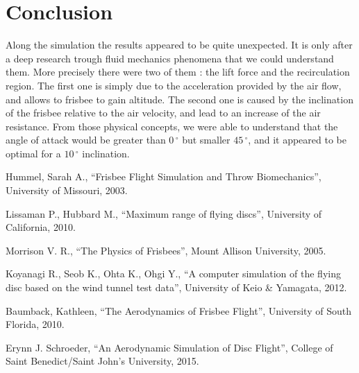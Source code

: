 \documentclass[10pt,a4paper]{report}
\begin{document}
\section{Conclusion}
Along the simulation the results appeared to be quite unexpected. It is only after a deep research trough fluid mechanics phenomena that we could understand them. More precisely there were two of them : the lift force and the recirculation region. The first one is simply due to the acceleration provided by the air flow, and allows to frisbee to gain altitude. The second one is caused by the inclination of the frisbee relative to the air velocity, and lead to an increase of the air resistance. From those physical concepts, we were able to understand that the angle of attack would be greater than $0\,^{\circ}$ but smaller $45\,^{\circ}$, and it appeared to be optimal for a $10\,^{\circ}$ inclination.


\begin{thebibliography}{9}

  Hummel, Sarah A.,
  “Frisbee Flight Simulation and Throw Biomechanics”,
  University of Missouri,
  2003.
  
  Lissaman P., Hubbard M.,
  “Maximum range of flying discs”,
  University of California,
  2010.
  
  Morrison V. R.,
  “The Physics of Frisbees”,
  Mount Allison University,
  2005.

  Koyanagi R., Seob K., Ohta K., Ohgi Y.,
  “A computer simulation of the flying disc based on the wind tunnel test data”,
  University of Keio \& Yamagata,
  2012.
  
  Baumback, Kathleen,
  “The Aerodynamics of Frisbee Flight”,
  University of South Florida,
  2010.
  
  Erynn J. Schroeder,
  “An Aerodynamic Simulation of Disc Flight”,
  College of Saint Benedict/Saint John's University,
  2015.

\end{thebibliography}
\end{document}
